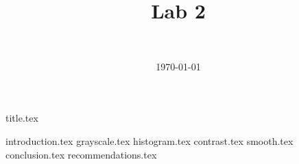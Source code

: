 \documentclass[final]{report} %
\title{Lab 2}
\author{~}
\date{\today}
\begin{document}

{title.tex}
\newpage
\tableofcontents

\newpage
{}
{introduction.tex}
{grayscale.tex}
{histogram.tex}
{contrast.tex}
{smooth.tex}
{conclusion.tex}
{recommendations.tex}
\newpage
{}

\printbibliography
\end{document}
